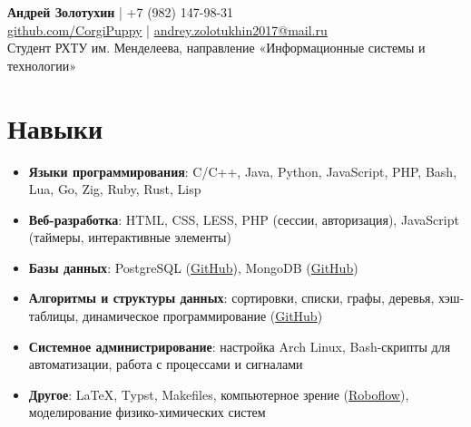 \documentclass[a4paper,11pt]{article}
\begin{document}
	\begin{center}
		{\Large\bfseries Андрей Золотухин} | +7 (982) 147-98-31 \\
		\vspace{0.2cm}
		\href{https://github.com/CorgiPuppy}{github.com/CorgiPuppy} | \href{mailto:andrey.zolotukhin2017@mail.ru}{andrey.zolotukhin2017@mail.ru} \\
		\vspace{0.2cm}
		Студент РХТУ им. Менделеева, направление «Информационные системы и технологии» \\
	\end{center}

	\section{Навыки}
	\begin{itemize}[leftmargin=*]
		\item \textbf{Языки программирования}: C/C++, Java, Python, JavaScript, PHP, Bash, Lua, Go, Zig, Ruby, Rust, Lisp
		\item \textbf{Веб-разработка}: HTML, CSS, LESS, PHP (сессии, авторизация), JavaScript (таймеры, интерактивные элементы)
		\item \textbf{Базы данных}: PostgreSQL (\href{https://github.com/CorgiPuppy/data-mgmt-labs/tree/master/lab6}{GitHub}), MongoDB (\href{https://github.com/CorgiPuppy/data-mgmt-labs/tree/master/lab8}{GitHub})
		\item \textbf{Алгоритмы и структуры данных}: сортировки, списки, графы, деревья, хэш-таблицы, динамическое программирование (\href{https://github.com/CorgiPuppy/algo-ds-labs}{GitHub})
		\item \textbf{Системное администрирование}: настройка Arch Linux, Bash-скрипты для автоматизации, работа с процессами и сигналами
		\item \textbf{Другое}: LaTeX, Typst, Makefiles, компьютерное зрение (\href{https://roboflow.com/}{Roboflow}), моделирование физико-химических систем
	\end{itemize}

\end{document}
